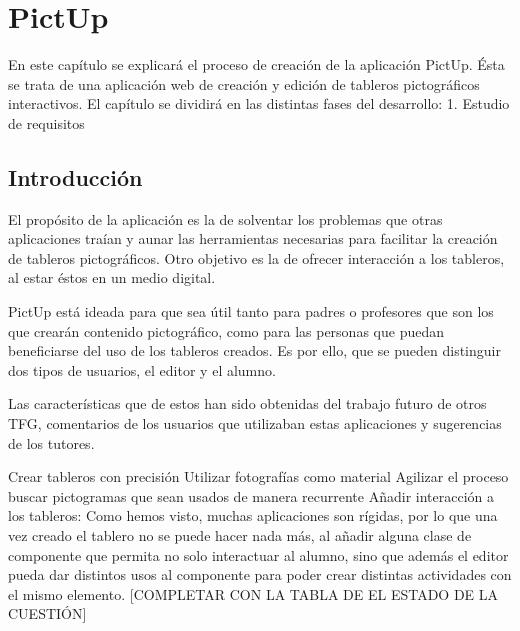 \chapter{PictUp}
\label{cap:introduccion}


\begin{resumen}
	
	En este capítulo se explicará el proceso de creación de la aplicación PictUp. Ésta se trata de una aplicación web de creación y edición de tableros pictográficos interactivos. El capítulo se dividirá en las distintas fases del desarrollo: 1. Estudio de requisitos 
	
\end{resumen}

\label{cap1:sec:Motivacion}


\section{Introducción}

El propósito de la aplicación es la de solventar los problemas que otras aplicaciones traían y aunar las herramientas necesarias para facilitar la creación de tableros pictográficos. Otro objetivo es la de ofrecer interacción a los tableros, al estar éstos en un medio digital. 

PictUp está ideada para que sea útil tanto para padres o profesores que son los que crearán contenido pictográfico, como para las personas que puedan beneficiarse del uso de los tableros creados. Es por ello, que se pueden distinguir dos tipos de usuarios, el editor y el alumno. 

Las características que de estos han sido obtenidas del trabajo futuro de otros TFG, comentarios de los usuarios que utilizaban estas aplicaciones y sugerencias de los tutores.

Crear tableros con precisión
Utilizar fotografías como material
Agilizar el proceso buscar pictogramas que sean usados de manera recurrente
Añadir interacción a los tableros:
Como hemos visto, muchas aplicaciones son rígidas, por lo que una vez creado el tablero no se puede hacer nada más, al añadir alguna clase de componente que permita no solo interactuar al alumno, sino que además el editor pueda dar distintos usos al componente para poder crear distintas actividades con el mismo elemento.
[COMPLETAR CON LA TABLA DE EL ESTADO DE LA CUESTIÓN]


